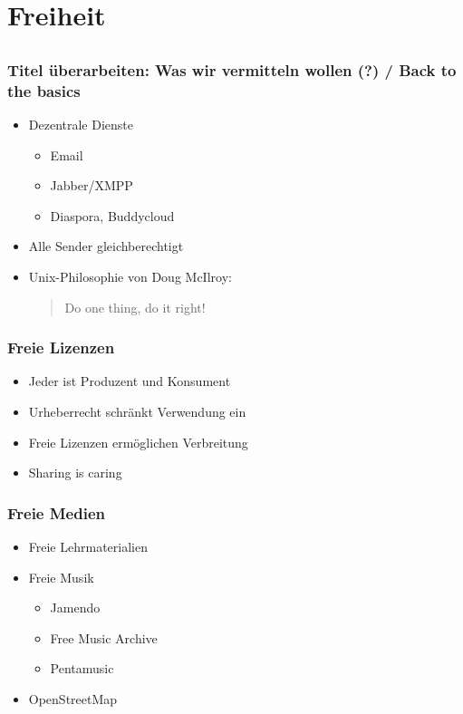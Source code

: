 \documentclass{beamer}
\newcommand{\ben}[1]{\pdfcomment[author=Ben]{#1}}
\begin{document}
\section{Freiheit}
\subsection{}

\begin{frame}
  \frametitle{Titel überarbeiten: Was wir vermitteln wollen (?) / Back to the basics}
  \begin{itemize}
    \item<2-> Dezentrale Dienste
      \begin{itemize}
        \item<3-> Email
        \item<4-> Jabber/XMPP
        \item<5-> Diaspora, Buddycloud
      \end{itemize}
    \item<6-> Alle Sender gleichberechtigt
    \item<7-> Unix-Philosophie von Doug McIlroy:
        \begin{quote}Do one thing, do it right!
        \end{quote}
  \end{itemize}
\end{frame}

\begin{frame}
  \frametitle{Freie Lizenzen}
  \begin{itemize}
    \item<2-> Jeder ist Produzent und Konsument
    \item<3-> Urheberrecht schränkt Verwendung ein
    \item<4-> Freie Lizenzen ermöglichen Verbreitung \textcopyleft
    \item<5-> Sharing is caring
  \end{itemize}
\end{frame}

\begin{frame}
  \frametitle{Freie Medien}
  \begin{itemize}
    \item<2-> Freie Lehrmaterialien
    \item<3-> Freie Musik
      \begin{itemize}
        \item Jamendo
        \item Free Music Archive
        \item Pentamusic
      \end{itemize}
    \item<4-> OpenStreetMap
  \end{itemize}
\end{frame}
\end{document}
